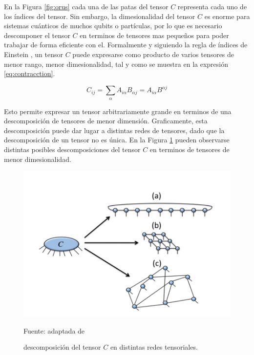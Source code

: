 En la Figura \ref{fig:orus} cada una de las patas del tensor $C$ representa cada uno de los índices del tensor. Sin embargo, la dimesionalidad del tensor $C$ es enorme para sistemas cuánticos de muchos qubits o partículas, por lo que es necesario descomponer el tensor $C$ en terminos de tensores mas pequeños para poder trabajar de forma eficiente con el. Formalmente y siguiendo la regla de índices de Einstein \citep{ahlander}, un tensor $C$ puede expresarse como producto de varios tensores de menor rango, menor dimesionalidad, tal y como se muestra en la expresión \ref{eq:contracction}.

\begin{equation}
    C_{i j} = \sum_{\alpha} A_{i  \alpha} B_{\alpha j} = A_{i  \alpha} B^{\alpha j}
    \label{eq:contracction}
\end{equation}

Esto permite expresar un tensor arbitrariamente grande en terminos de una descomposición de tensores de menor dimensión. Graficamente, esta descomposición puede dar lugar a distintas redes de tensores, dado que la descomposición de un tensor no es única. En la Figura \ref{fig:c_descomposition} pueden observarse distintas posibles descomposiciones del tensor $C$ en terminos de tensores de menor dimesionalidad.


\begin{figure}[!ht]
    \centering
    \includegraphics[scale = 0.7]{img/03-tensor_descomposicion.png}
    \caption{descomposición del tensor $C$ en distintas redes tensoriales.}
    Fuente: adaptada de \cite{orus} 
    \label{fig:c_descomposition}
\end{figure}

